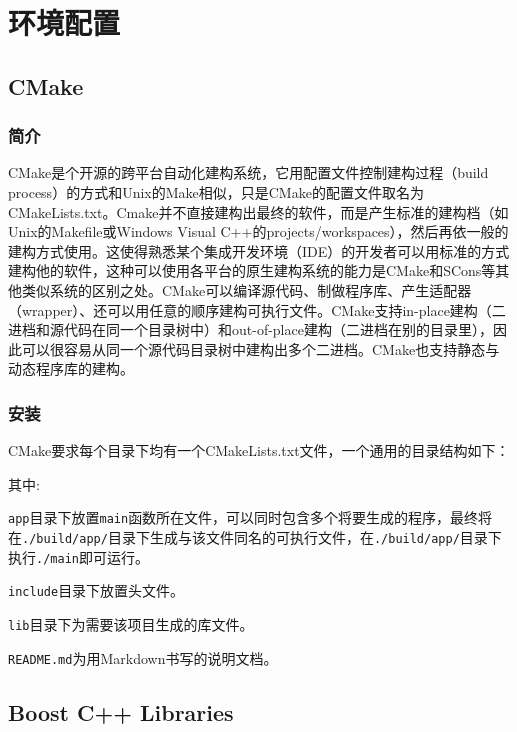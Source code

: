 \chapter{环境配置}
\section{CMake}
	\subsection{简介}
	\par CMake是个开源的跨平台自动化建构系统，它用配置文件控制建构过程（build process）的方式和Unix的Make相似，只是CMake的配置文件取名为CMakeLists.txt。Cmake并不直接建构出最终的软件，而是产生标准的建构档（如Unix的Makefile或Windows Visual C++的projects/workspaces），然后再依一般的建构方式使用。这使得熟悉某个集成开发环境（IDE）的开发者可以用标准的方式建构他的软件，这种可以使用各平台的原生建构系统的能力是CMake和SCons等其他类似系统的区别之处。CMake可以编译源代码、制做程序库、产生适配器（wrapper）、还可以用任意的顺序建构可执行文件。CMake支持in-place建构（二进档和源代码在同一个目录树中）和out-of-place建构（二进档在别的目录里），因此可以很容易从同一个源代码目录树中建构出多个二进档。CMake也支持静态与动态程序库的建构。\cite{ wiki:CMake}
	\subsection{安装}
	\par CMake要求每个目录下均有一个CMakeLists.txt文件，一个通用的目录结构如下：
	\par\noindent 其中:\\
	\par\noindent \lstinline[language=sh]{app}目录下放置\lstinline[language=sh]{main}函数所在文件，可以同时包含多个将要生成的程序，最终将在\lstinline[language=sh]{./build/app/}目录下生成与该文件同名的可执行文件，在\lstinline[language=sh]{./build/app/}目录下执行\lstinline[language=sh]{./main}即可运行。
	\par\noindent \lstinline[language=sh]{include}目录下放置头文件。
	\par\noindent \lstinline[language=sh]{lib}目录下为需要该项目生成的库文件。
	\par\noindent \lstinline[language=sh]{README.md}为用Markdown书写的说明文档。
\section{Boost C++ Libraries}
